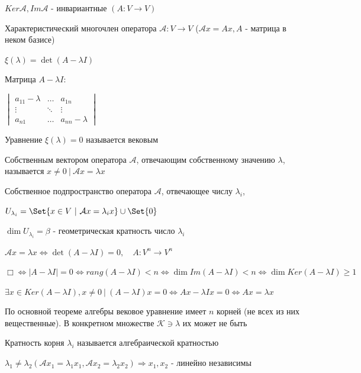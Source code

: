 \documentclass[12pt]{article}
\begin{document}
    \Nota $Ker \mathcal{A}, Im \mathcal{A}$ - инвариантные $(A : V \rightarrow V)$

    \Def Характеристический многочлен оператора $\mathcal{A} : V \rightarrow V$
    ($\mathcal{A}x = Ax, A$ - матрица в неком базисе)

    $\xi(\lambda) = \det(A - \lambda I)$

    \Nota Матрица $A - \lambda I$:

    $\displaystyle \begin{vmatrix}a_{11} - \lambda & \dots & a_{1n} \\ \vdots & \ddots & \vdots \\ a_{n1} & \dots & a_{nn} - \lambda \end{vmatrix}$

    \Nota Уравнение $\xi(\lambda) = 0$ называется вековым

    \Def Собственным вектором оператора $\mathcal{A}$, отвечающим собственному значению $\lambda$,
    называется $x \neq 0 \ | \ \mathcal{A}x = \lambda x$

    \Def Собственное подпространство оператора $\mathcal{A}$, отвечающее числу $\displaystyle \lambda_i$,

    $\displaystyle U_{\lambda_i} = \Set{x \in V \ | \ \mathcal{A}x = \lambda_i x} \union \Set{0}$

    \Def $\displaystyle \dim U_{\lambda_i} = \beta$ - геометрическая кратность число $\displaystyle \lambda_i$

    \Th $\displaystyle \mathcal{A}x = \lambda x \Longleftrightarrow \det(A - \lambda I) = 0, \quad A : V^n \rightarrow V^n$

    $\Box \Longleftrightarrow |A - \lambda I| = 0 \Longleftrightarrow rang (A - \lambda I) < n \Longleftrightarrow
    \dim Im(A - \lambda I) < n \Longleftrightarrow \dim Ker(A - \lambda I) \geq 1$

    $\exists x \in Ker(A - \lambda I), x \neq 0 \ | \ (A - \lambda I) x = 0 \Longleftrightarrow Ax - \lambda I x = 0 \Longleftrightarrow Ax = \lambda x$

    \Nota По основной теореме алгебры вековое уравнение имеет $n$ корней (не всех из них вещественные).
    В конкретном множестве $\mathcal{K} \ni \lambda$ их может не быть

    \Def Кратность корня $\displaystyle \lambda_i$ называется алгебраической кратностью

    \Th $\displaystyle \lambda_1 \neq \lambda_2 (\mathcal{A}x_1 = \lambda_1 x_1, \mathcal{A}x_2 = \lambda_2 x_2) \Longrightarrow x_1, x_2$ - линейно независимы
\end{document}
